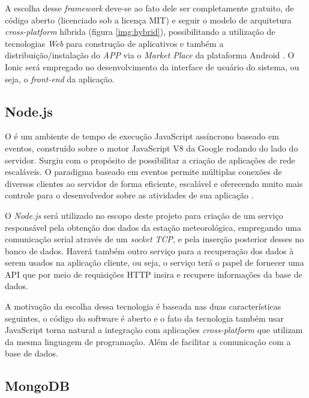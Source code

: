 A escolha desse \textit{framework} deve-se ao fato dele ser completamente gratuito, de código aberto (licenciado sob a licença MIT) e seguir o modelo de arquitetura \textit{cross-platform} híbrida (figura \ref{img:hybrid}), possibilitando a utilização de tecnologias \textit{Web} para construção de aplicativos e também a distribuição/instalação do \textit{APP} via o \textit{Market Place} da plataforma Android \cite{SITEIONIC}. O Ionic será empregado no desenvolvimento da interface de usuário do sistema, ou seja, o \textit{front-end} da aplicação.



\subsection{Node.js} \label{subsec:NodeJs}

O  é um ambiente de tempo de execução JavaScript assíncrono baseado em eventos, construído sobre o motor JavaScript V8 da Google rodando do lado do servidor. Surgiu com o propósito de possibilitar a criação de aplicações de rede escaláveis. O paradigma baseado em eventos permite múltiplas conexões de diversos clientes ao servidor de forma eficiente, escalável e oferecendo muito mais controle para o desenvolvedor sobre as atividades de sua aplicação \cite{tilkov2010node}.
    
O \textit{Node.js} será utilizado no escopo deste projeto para criação de um serviço responsável pela obtenção dos dados da estação meteorológica, empregando uma comunicação serial através de um \textit{socket TCP}, e pela inserção posterior desses no banco de dados. Haverá também outro serviço para a recuperação dos dados à serem usados na aplicação cliente, ou seja, o serviço terá o papel de fornecer uma API que por meio de requisições HTTP insira e recupere informações da base de dados.

A motivação da escolha dessa tecnologia é baseada nas duas características seguintes, o código do software é aberto e o fato da tecnologia também usar JavaScript torna natural a integração com aplicações \textit{cross-platform} que utilizam da mesma linguagem de programação. Além de facilitar a comunicação com a base de dados.


\subsection{MongoDB} \label{subsec:MongoDB}

